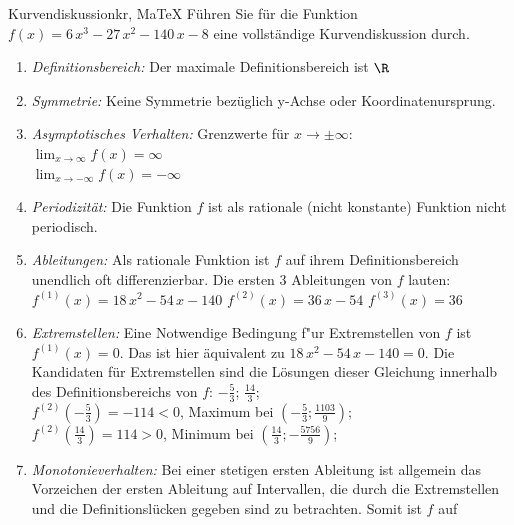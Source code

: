  \providecommand{\MoIl}{(} 
 \providecommand{\MoIr}{)}
 \providecommand{\MIntvlSep}{;} 
 \providecommand{\MElSetSep}{;} 
 \begin{MAufgabe}{Kurvendiskussion}{kr, MaTeX}
 F\"uhren Sie f\"ur die Funktion $f(x)=6\, x^3 - 27\, x^2 - 140\, x - 8$ eine vollst\"andige Kurvendiskussion durch.\\ 
 \ifLsg\Loesung
 \begin{enumerate}
 \item \emph{Definitionsbereich:} 
 Der maximale Definitionsbereich ist $\R$\item \emph{Symmetrie:} 
 Keine Symmetrie bez\"uglich y-Achse oder Koordinatenursprung.\item \emph{Asymptotisches Verhalten:} 
 Grenzwerte f\"ur $x\rightarrow \pm \infty$: \\ 
 $\lim_{x\rightarrow \infty} f(x)=\infty$ \\ 
 $\lim_{x\rightarrow -\infty} f(x)=- \infty$ \\ 
 \item \emph{Periodizit\"at:} 
 Die Funktion $f$ ist als rationale (nicht konstante) Funktion nicht periodisch.\item \emph{Ableitungen:} 
 Als rationale Funktion ist $f$ auf ihrem Definitionsbereich unendlich oft differenzierbar. 
 Die ersten 3 Ableitungen von $f$ lauten: \\ 
 $f^{(1)}(x)=18\, x^2 - 54\, x - 140$\newline 
  $f^{(2)}(x)=36\, x - 54$\newline 
  $f^{(3)}(x)=36$\newline 
  \item \emph{Extremstellen:} 
 Eine Notwendige Bedingung f"ur Extremstellen von $f$ ist $f^{(1)}(x)=0$. 
 Das ist hier \"aquivalent zu $18\, x^2 - 54\, x - 140=0$. 
 Die Kandidaten f\"ur Extremstellen sind die L\"osungen dieser Gleichung innerhalb des Definitionsbereichs von $f$: $- \frac{5}{3}$; $\frac{14}{3}$; \\ 
 $f^{(2)}(- \frac{5}{3})=-114$$<0$, Maximum bei $(- \frac{5}{3};\frac{1103}{9})$; \\ 
 $f^{(2)}(\frac{14}{3})=114$$>0$, Minimum bei $(\frac{14}{3};- \frac{5756}{9})$; \\ 
 \item \emph{Monotonieverhalten:} 
 Bei einer stetigen ersten Ableitung ist allgemein das Vorzeichen der ersten Ableitung auf Intervallen, die durch die Extremstellen und die Definitionsl\"ucken gegeben sind zu betrachten. Somit ist $f$ auf \\ 

\end{enumerate}
\end{MAufgabe}

